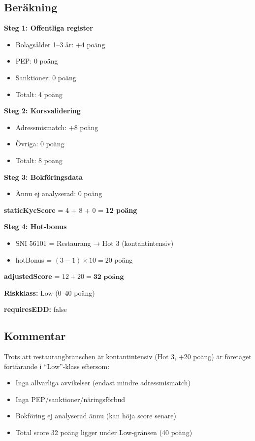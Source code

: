 \documentclass[12pt,a4paper]{article}
\begin{document}
\subsection{Beräkning}

\textbf{Steg 1: Offentliga register}
\begin{itemize}[noitemsep]
  \item Bolagsålder 1–3 år: +4 poäng
  \item PEP: 0 poäng
  \item Sanktioner: 0 poäng
  \item Totalt: 4 poäng
\end{itemize}

\textbf{Steg 2: Korsvalidering}
\begin{itemize}[noitemsep]
  \item Adressmismatch: +8 poäng
  \item Övriga: 0 poäng
  \item Totalt: 8 poäng
\end{itemize}

\textbf{Steg 3: Bokföringsdata}
\begin{itemize}[noitemsep]
  \item Ännu ej analyserad: 0 poäng
\end{itemize}

\textbf{staticKycScore} = 4 + 8 + 0 = \textbf{12 poäng}

\textbf{Steg 4: Hot-bonus}
\begin{itemize}[noitemsep]
  \item SNI 56101 = Restaurang → Hot 3 (kontantintensiv)
  \item hotBonus = $(3-1) \times 10 = 20$ poäng
\end{itemize}

\textbf{adjustedScore} = $12 + 20 = \textbf{32 poäng}$

\textbf{Riskklass:} Low (0–40 poäng)

\textbf{requiresEDD:} false

\subsection{Kommentar}

Trots att restaurangbranschen är kontantintensiv (Hot 3, +20 poäng) är företaget fortfarande i \enquote{Low}-klass eftersom:
\begin{itemize}[noitemsep]
  \item Inga allvarliga avvikelser (endast mindre adressmismatch)
  \item Inga PEP/sanktioner/näringsförbud
  \item Bokföring ej analyserad ännu (kan höja score senare)
  \item Total score 32 poäng ligger under Low-gränsen (40 poäng)
\end{itemize}
\end{document}
